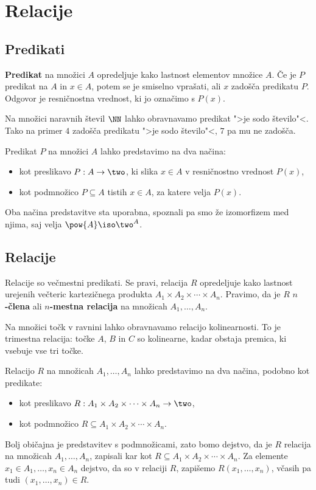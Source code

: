 \chapter{Relacije}

\section{Predikati}

\textbf{Predikat} na množici $A$ opredeljuje kako lastnost elementov množice $A$. Če
je $P$ predikat na $A$ in $x \in A$, potem se je smiselno vprašati, ali $x$
zadošča predikatu $P$. Odgovor je resničnostna vrednost, ki jo označimo s $P(x)$.

\begin{zgled}
  Na množici naravnih števil $\NN$ lahko obravnavamo predikat ">je sodo
  število"<. Tako na primer $4$ zadošča predikatu ">je sodo število"<, $7$ pa mu ne zadošča.
\end{zgled}

Predikat $P$ na množici $A$ lahko predstavimo na dva načina:
%
\begin{itemize}
\item kot preslikavo $P : A \to \two$, ki slika $x \in A$ v resničnostno vrednost $P(x)$,
\item kot podmnožico $P \subseteq A$ tistih $x \in A$, za katere velja $P(x)$.
\end{itemize}
%
Oba načina predstavitve sta uporabna, spoznali pa smo že izomorfizem med njima,
saj velja $\pow{A} \iso \two^A$.

\section{Relacije}

Relacije so večmestni predikati. Se pravi, relacija $R$ opredeljuje kako
lastnost urejenih večteric kartezičnega produkta $A_1 \times A_2 \times \cdots \times A_n$. Pravimo, da je $R$ \textbf{$n$-člena} ali \textbf{$n$-mestna relacija} na množicah $A_1, …, A_n$.

\begin{zgled}
  Na množici točk v ravnini lahko obravnavamo relacijo kolinearnosti.
  To je trimestna relacija: točke $A$, $B$ in $C$ so kolinearne, kadar obstaja
  premica, ki vsebuje vse tri točke.
\end{zgled}

Relacijo $R$ na množicah $A_1, \ldots, A_n$ lahko predstavimo na dva načina, podobno
kot predikate:
\begin{itemize}
\item kot preslikavo $R : A_1 \times A_2 \times \cdots \times A_n \to \two$,
\item kot podmnožico $R \subseteq A_1 \times A_2 \times \cdots \times A_n$.
\end{itemize}
%
Bolj običajna je predstavitev s podmnožicami, zato bomo dejstvo, da je $R$
relacija na množicah $A_1, \ldots, A_n$, zapisali kar kot $R \subseteq A_1 \times A_2 \times \cdots \times A_n$.
Za elemente $x_1 \in A_1, \ldots, x_n \in A_n$ dejstvo, da so v relaciji $R$, zapišemo
$R(x_1, \ldots, x_n)$, včasih pa tudi $(x_1, \ldots, x_n) \in R$.

